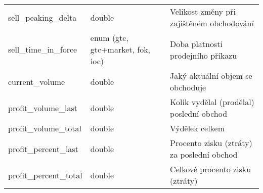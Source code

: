 \begin{center}
\begin{longtable}[h]{|l|C{4cm}|p{4cm}|}
        sell\_peaking\_delta                  & double                                                                                                                                                           & Velikost změny při zajištěném obchodování                                                                                         \\
        sell\_time\_in\_force                 & enum (gtc, gtc+market, fok, ioc)                                                                                                                                 & Doba platnosti prodejního příkazu                                                                                                 \\
        current\_volume                       & double                                                                                                                                                           & Jaký aktuální objem se obchoduje                                                                                                  \\
        profit\_volume\_last                  & double                                                                                                                                                           & Kolik vydělal (prodělal) poslední obchod                                                                                          \\
        profit\_volume\_total                 & double                                                                                                                                                           & Výdělek celkem                                                                                                                    \\
        profit\_percent\_last                 & double                                                                                                                                                           & Procento zisku (ztráty) za poslední obchod                                                                                        \\
        profit\_percent\_total                & double                                                                                                                                                           & Celkové procento zisku (ztráty)                                                                                                   \\

\end{longtable}
\end{center}
